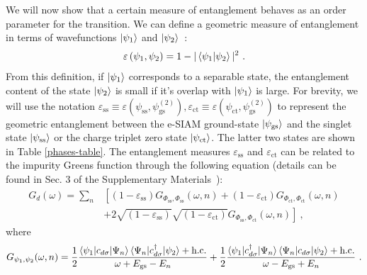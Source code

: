 \documentclass{iopart}
\begin{document}
We will now show that a certain measure of entanglement behaves as an order parameter for the transition. We can define a geometric measure of entanglement in terms of wavefunctions \(\ket{\psi_1}\) and \(\ket{\psi_2}\)~\cite{shimony1995degree,wei2003geometric,horodecki2009quantum}:
\begin{eqnarray}
	\varepsilon\left(\psi_1,\psi_2\right) = 1 - |\braket{\psi_1 | \psi_2}|^2~.
\end{eqnarray}
From this definition, if \(\ket{\psi_1}\) corresponds to a separable state, the entanglement content of the state \(\ket{\psi_2}\) is small if it's overlap with \(\ket{\psi_1}\) is large.
For brevity, we will use the notation \(\varepsilon_\text{ss} \equiv \varepsilon\left(\psi_\text{ss},\psi^{(2)}_\text{gs}\right), \varepsilon_\text{ct} \equiv \varepsilon\left(\psi_\text{ct},\psi^{(2)}_\text{gs}\right)\) to represent the geometric entanglement between the e-SIAM ground-state \(\ket{\psi_\text{gs}}\) and the singlet state \(\ket{\psi_\text{ss}}\) or the charge triplet zero state \(\ket{\psi_\text{ct}}\).
The latter two states are shown in Table \eqref{phases-table}.
The entanglement measures $\varepsilon_{\text{ss}}$ and $\varepsilon_{\text{ct}}$ can be related to the impurity Greens function through the following equation (details can be found in Sec. 3 of the Supplementary Materials~\cite{supp_mat}):
\begin{eqnarray}
	G_d(\omega) = \sum_n &\left[\left(1 - \varepsilon_\text{ss} \right) G_{\Phi_\text{ss},\Phi_\text{ss}}(\omega,n) + \left(1 - \varepsilon_\text{ct} \right) G_{\Phi_\text{ct},\Phi_\text{ct}}(\omega,n) \right.\nonumber \\
			     &\left.+ 2\sqrt{\left(1 - \varepsilon_\text{ss} \right)}\sqrt{\left(1 - \varepsilon_\text{ct} \right)} G_{\Phi_\text{ss},\Phi_\text{ct}}(\omega,n)\right]~,
	\label{greens-func}
\end{eqnarray}
where
\begin{eqnarray}
	G_{\psi_1,\psi_2}(\omega,n) = \frac{1}{2}\frac{\braket{\psi_1 | c_{d\sigma} | \Psi_n}\braket{\Psi_n | c^\dagger_{d\sigma} | \psi_2} + \text{h.c.}}{\omega + E_\text{gs} - E_n} + \frac{1}{2}\frac{\braket{\psi_1 | c^\dagger_{d\sigma} | \Psi_n}\braket{\Psi_n | c_{d\sigma} | \psi_2} + \text{h.c.}}{\omega - E_\text{gs} + E_n}~.
\end{eqnarray}
\end{document}
